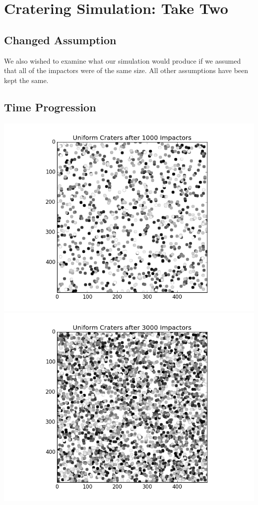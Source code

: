 \documentclass[11pt]{article}
\begin{document}
\section{Cratering Simulation: Take Two}

\subsection{Changed Assumption}
We also wished to examine what our simulation would produce if we assumed that all of the impactors were of the same size. All other assumptions have been kept the same.

\subsection{Time Progression}
\includegraphics[scale=.4]{Uniform1.png}
\includegraphics[scale=.4]{Uniform3.png}\\
\end{document}

